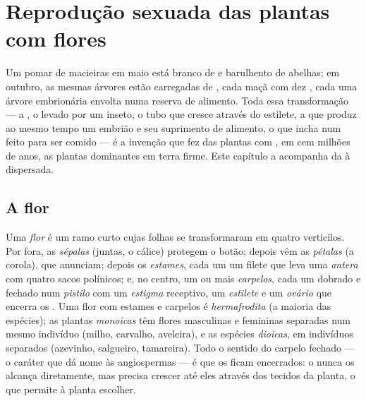 \chapter{Reprodução sexuada das plantas com flores}\label{ch:b2:angiosperm-reproduction}

Um pomar de macieiras em maio está branco de  e barulhento de
abelhas; em outubro, as mesmas árvores estão carregadas de , cada
maçã com dez , cada  uma árvore embrionária envolta
numa reserva de alimento. Toda essa transformação --- a , o 
levado por um inseto, o tubo que cresce através do estilete, a  que produz ao mesmo tempo um embrião e seu suprimento de
alimento, o  que incha num  feito para ser comido --- é a
invenção que fez das plantas com , em cem milhões de anos, as
plantas dominantes em terra firme. Este capítulo a acompanha da  à
 dispersada.

\section{A flor}

\begin{definition}\label{def:b2:angiosperm-reproduction:flower}
Uma \emph{flor} é um ramo curto cujas folhas se transformaram em
quatro verticilos. Por fora, as \emph{sépalas} (juntas, o cálice)
protegem o botão; depois vêm as \emph{pétalas} (a corola), que
anunciam; depois os \emph{estames}, cada um um filete que leva uma
\emph{antera} com quatro sacos polínicos; e, no centro, um ou mais
\emph{carpelos}, cada um dobrado e fechado num \emph{pistilo} com um
\emph{estigma} receptivo, um \emph{estilete} e um \emph{ovário} que
encerra os \emph{}. Uma flor com estames e carpelos é
\emph{hermafrodita} (a maioria das espécies); as plantas
\emph{monoicas} têm flores masculinas e femininas separadas num mesmo
indivíduo (milho, carvalho, aveleira), e as espécies \emph{dioicas}, em
indivíduos separados (azevinho, salgueiro, tamareira). Todo o sentido
do carpelo fechado --- o caráter que dá nome às angiospermas --- é que
os  ficam encerrados: o  nunca os alcança diretamente, mas
precisa crescer até eles através dos tecidos da planta, o que permite
à planta escolher.
\end{definition}

